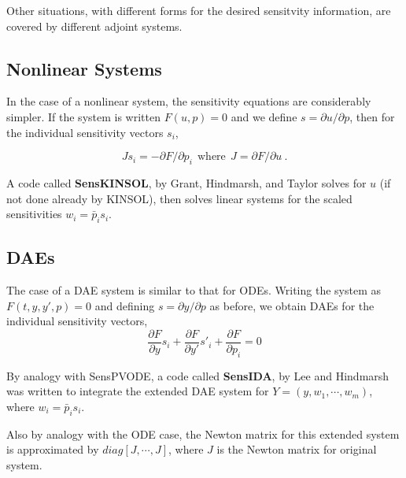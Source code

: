 Other situations, with different forms for the desired sensitvity
information, are covered by different adjoint systems.


\subsection{Nonlinear Systems}

In the case of a nonlinear system, the sensitivity equations are
considerably simpler.  If the system is written $F(u,p) = 0$ and we
define $s = \partial u / \partial p$, then for the individual
sensitivity vectors $s_i$,

\[ J s_i = -\partial F / \partial p_i ~~\mbox{where} ~~
          J = \partial F / \partial u ~. \]

A code called {\bf SensKINSOL}, by Grant, Hindmarsh, and Taylor
\cite{GHT:03} solves for $u$ (if not done already by KINSOL), then
solves linear systems for the scaled sensitivities $w_i = \bar{p}_i s_i$.


\subsection{DAEs}

The case of a DAE system is similar to that for ODEs.  Writing the
system as $F(t,y,y',p) = 0$ and defining $s = \partial y / \partial p$
as before, we obtain DAEs for the individual sensitivity vectors,
\[ \frac{\partial F}{\partial y} s_i + \frac{\partial F}{\partial y'} s'_i
                                 + \frac{\partial F}{\partial p_i}  = 0 \]

By analogy with SensPVODE, a code called {\bf SensIDA}, by Lee and
Hindmarsh was written to integrate the extended DAE system for
$Y = (y,w_1,\cdots,w_m)$, where $w_i = \bar{p}_i s_i$.

Also by analogy with the ODE case, the Newton matrix for this extended
system is approximated by $diag[J,\cdots,J]$, where $J$ is the Newton
matrix for original system.


